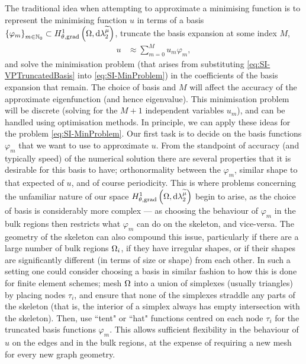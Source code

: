 The traditional idea when attempting to approximate a minimising function is to represent the minimising function $u$ in terms of a basis $\left\{ \varphi_m \right\}_{m\in\mathbb{N}_0}\subset H^1_{\theta, \mathrm{grad}}\left( \Omega, \mathrm{d}\lambda_2^{\widetilde{\mu}} \right)$, truncate the basis expansion at some index $M$,
\begin{align} \label{eq:SI-VPTruncatedBasis}
	u &\approx \sum_{m=0}^M u_m \varphi_m,
\end{align}
and solve the minimisation problem (that arises from substituting \eqref{eq:SI-VPTruncatedBasis} into \eqref{eq:SI-MinProblem}) in the coefficients of the basis expansion that remain.
The choice of basis and $M$ will affect the accuracy of the approximate eigenfunction (and hence eigenvalue).
This minimisation problem will be discrete (solving for the $M+1$ independent variables $u_m$), and can be handled using optimisation methods.
In principle, we can apply these ideas for the problem \eqref{eq:SI-MinProblem}.
Our first task is to decide on the basis functions $\varphi_m$ that we want to use to approximate $u$.
From the standpoint of accuracy (and typically speed) of the numerical solution there are several properties that it is desirable for this basis to have; orthonormality between the $\varphi_m$, similar shape to that expected of $u$, and of course periodicity.
This is where problems concerning the unfamiliar nature of our space $H^1_{\theta, \mathrm{grad}}\left( \Omega, \mathrm{d}\lambda_2^{\widetilde{\mu}} \right)$ begin to arise, as the choice of basis is considerably more complex --- as choosing the behaviour of $\varphi_m$ in the bulk regions then restricts what $\varphi_m$ can do on the skeleton, and vice-versa. 
The geometry of the skeleton can also compound this issue, particularly if there are a large number of bulk regions $\Omega_i$, if they have irregular shapes, or if their shapes are significantly different (in terms of size or shape) from each other.
In such a setting one could consider choosing a basis in similar fashion to how this is done for finite element schemes; mesh $\Omega$ into a union of simplexes (usually triangles) by placing nodes $\tau_i$, and  ensure that none of the simplexes straddle any parts of the skeleton (that is, the interior of a simplex always has empty intersection with the skeleton).
Then, use ``tent" or ``hat" functions centred on each node $\tau_i$ for the truncated basis functions $\varphi_m$.
This allows sufficient flexibility in the behaviour of $u$ on the edges and in the bulk regions, at the expense of requiring a new mesh for every new graph geometry.

